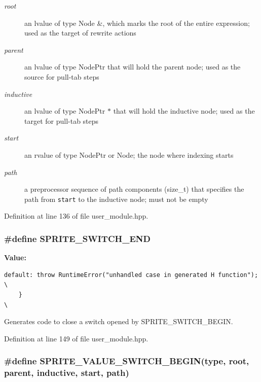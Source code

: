 \begin{Desc}
\item[Parameters:]
\begin{description}
\item[{\em root}]an lvalue of type Node \&, which marks the root of the entire expression; used as the target of rewrite actions \item[{\em parent}]an lvalue of type Node\-Ptr that will hold the parent node; used as the source for pull-tab steps \item[{\em inductive}]an lvalue of type Node\-Ptr $\ast$ that will hold the inductive node; used as the target for pull-tab steps \item[{\em start}]an rvalue of type Node\-Ptr or Node; the node where indexing starts \item[{\em path}]a preprocessor sequence of path components (size\_\-t) that specifies the path from {\tt start} to the inductive node; must not be empty \end{description}
\end{Desc}


Definition at line 136 of file user\_\-module.hpp.
\subsubsection{\setlength{\rightskip}{0pt plus 5cm}\#define SPRITE\_\-SWITCH\_\-END}\label{user__module_8hpp_a2}


{\bf Value:}

\footnotesize\begin{verbatim}default: throw RuntimeError("unhandled case in generated H function"); \
    }                                                                        \
\end{verbatim}\normalsize 
Generates code to close a switch opened by SPRITE\_\-SWITCH\_\-BEGIN. 



Definition at line 149 of file user\_\-module.hpp.
\subsubsection{\setlength{\rightskip}{0pt plus 5cm}\#define SPRITE\_\-VALUE\_\-SWITCH\_\-BEGIN(type, root, parent, inductive, start, path)}\label{user__module_8hpp_a3}


